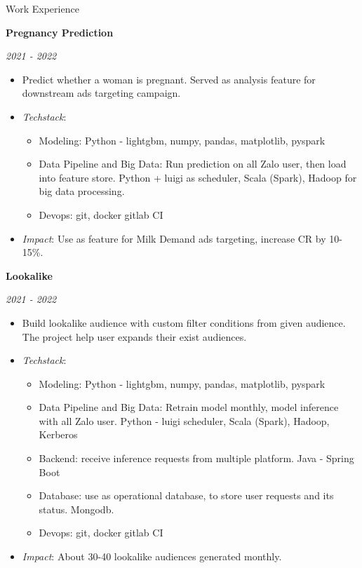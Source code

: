 \documentclass{resume} %
\begin{document}
\begin{rSection}{Work Experience}
{{{\textbf{Pregnancy Prediction } \hfill {\em \textit{2021 - 2022}
\begin{itemize}
    \item Predict whether a woman is pregnant. Served as analysis feature for downstream ads targeting campaign.
    \item \textit{Techstack}:
    \begin{itemize}
        \item Modeling: Python - lightgbm, numpy, pandas, matplotlib, pyspark
        \item Data Pipeline and Big Data: Run prediction on all Zalo user, then load into feature store. Python + luigi as scheduler, Scala (Spark), Hadoop for big data processing.
        \item Devops: git, docker gitlab CI
    \end{itemize} 
    \item \textit{Impact}: Use as feature for Milk Demand ads targeting, increase CR by 10-15\%.
\end{itemize}

\textbf{Lookalike} \hfill {\em \textit{2021 - 2022}
\begin{itemize}
    \item Build lookalike audience with custom filter conditions from given audience. The project help user expands their exist audiences.
    \item \textit{Techstack}:
    \begin{itemize}
        \item Modeling: Python - lightgbm, numpy, pandas, matplotlib, pyspark
        \item Data Pipeline and Big Data: Retrain model monthly,  model inference with all Zalo user. Python - luigi scheduler, Scala (Spark), Hadoop, Kerberos
        \item Backend: receive inference requests from multiple platform. Java - Spring Boot
        \item Database: use as operational database, to store user requests and its status. Mongodb.
        \item Devops: git, docker gitlab CI
    \end{itemize} 
    \item \textit{Impact}: About 30-40 lookalike audiences generated monthly.
\end{itemize}


}}}}}
\end{rSection}
\end{document}
